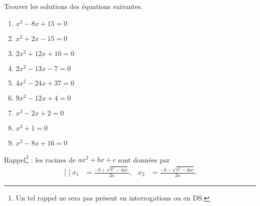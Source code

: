 
\begin{exercice}\label{exoPremiere-0069}

    Trouver les solutions des équations suivantes.
    \begin{multicols}{3}
        \begin{enumerate}
            \item
                \( x^2-8x+15=0\)
            \item
                \( x^2+2x-15=0\)
            \item
                \( 2x^2+12x+10=0\)
            \item
                \( 2x^2-13x-7=0\)
            \item
                \( 4x^2-24x+37=0\)
            \item
                \( 9x^2-12x+4=0\)
            \item
                \( x^2-2x+2=0\)
            \item
                \( x^2+1=0\)
            \item
                \( x^2-8x+16=0\)
        \end{enumerate}
    \end{multicols}

    Rappel\footnote{Un tel rappel ne sera pas présent en interrogations ou en DS.} : les racines de \( ax^2+bx+c\) sont données par
    \begin{equation}
        \begin{aligned}[]
            x_1&=\frac{ -b+\sqrt{b^2-4ac} }{ 2a },&x_2&=\frac{ -b-\sqrt{b^2-4ac} }{ 2a }.
        \end{aligned}
    \end{equation}

\end{exercice}

